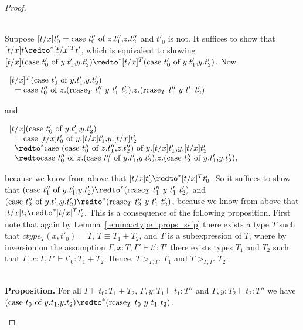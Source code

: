 \begin{proof}
\begin{itemize}
    \ \\
    Suppose $[t/x]t'_0 = \mbox{case}\ t''_0\ \text{of}\ z\text{.}t''_1\text{,}z\text{.}t''_2$ and $t'_0$ is not.  It suffices to show that 
    $[t/x]t \redto^* [t/x]^T t'$, which is equivalent to showing 
    $[t/x](\ccon{t'_0}{y}{t'_1}{t'_2}) \redto^* [t/x]^T (\ccon{t'_0}{y}{t'_1}{t'_2})$.  Now
    \begin{center}
      \begin{math}
        \begin{array}{lll}
          [t/x]^T (\mbox{case}\ t'_0\ \text{of}\ y\text{.}t'_1\text{,}y\text{.}t'_2)\\
          \,\,\,\,= \mbox{case}\ t''_0\ \text{of}\ z\text{.}(\mbox{rcase}_{T}\ t''_1\ y\ t'_1\ t'_2)\text{,}z\text{.}(\mbox{rcase}_{T}\ t''_1\ y\ t'_1\ t'_2)
        \end{array}
      \end{math}
    \end{center}
    and
    \begin{center}
      \begin{math}
        \begin{array}{lll}
          [t/x] (\ccon{t'_0}{y}{t'_1}{t'_2})\\
          \,\,\,\,= \ccon{[t/x]t'_0}{y}{[t/x]t'_1}{[t/x]t'_2} \\
          \,\,\,\,\redto^* \ccon{(\ccon{t''_0}{z}{t''_1}{t''_2})}{y}{[t/x]t'_1}{[t/x]t'_2} \\
          \,\,\,\,\redto \ccon{t''_0}{z}{(\ccon{t''_1}{y}{t'_1}{t'_2})}{(\ccon{t''_2}{y}{t'_1}{t'_2})},
        \end{array}
      \end{math}
    \end{center}
    because we know from above that $[t/x]t'_0 \redto^* [t/x]^T t'_0$.  So it suffices to show that
    $(\ccon{t''_1}{y}{t'_1}{t'_2}) \redto^* (\rcase{T}{t''_1}{y}{t'_1}{t'_2})$ and
    $(\ccon{t''_2}{y}{t'_1}{t'_2}) \redto^* (\rcase{T}{t''_2}{y}{t'_1}{t'_2})$, because we know from above that 
    $[t/x]t_i \redto^* [t/x]^T t'_i$.  This is a consequence of the following proposition.  First note that 
    again by Lemma~\ref{lemma:ctype_props_ssfp} there exists a type $T$ such that $ctype_T(x,t'_0) = T$,
    $T \equiv T_1+T_2$, and $T$ is a subexpression of $T$, where by inversion on the assumption
    $\Gamma,x:T,\Gamma' \vdash t':T'$ there exists types $T_1$ and $T_2$ such that 
    $\Gamma,x:T,\Gamma' \vdash t'_0:T_1+T_2$.  Hence, $T >_{\Gamma,\Gamma'} T_1$ and
    $T >_{\Gamma,\Gamma'} T_2$.  
    
    \ \\
    {\bf Proposition.} For all $\Gamma \vdash t_0:T_1+T_2$, $\Gamma,y:T_1 \vdash t_1:T''$ and
    $\Gamma,y:T_2 \vdash t_2:T''$ we have 
    $(\ccon{t_0}{y}{t_1}{t_2}) \redto^* (\rcase{T}{t_0}{y}{t_1}{t_2})$.
    

\end{itemize}
\end{proof}

